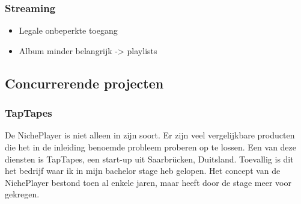 \subsubsection*{Streaming}
\begin{itemize}
    \item Legale onbeperkte toegang
    \item Album minder belangrijk -> playlists
\end{itemize}

\subsection{Concurrerende projecten}
\subsubsection*{TapTapes}
De NichePlayer is niet alleen in zijn soort. Er zijn veel vergelijkbare producten die het in de inleiding benoemde probleem proberen op te lossen. Een van deze diensten is TapTapes, een start-up uit Saarbrücken, Duitsland. Toevallig is dit het bedrijf waar ik in mijn bachelor stage heb gelopen. Het concept van de NichePlayer bestond toen al enkele jaren, maar heeft door de stage meer voor gekregen.
